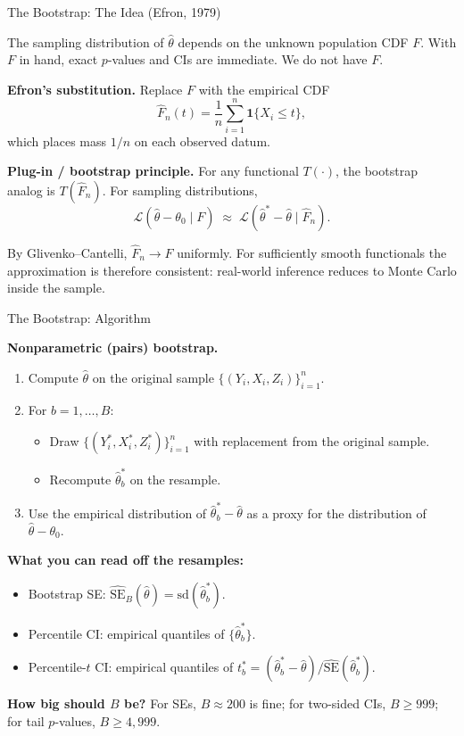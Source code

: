 \documentclass[aspectratio=169, handout]{beamer}
\numberwithin{equation}{section}
\begin{document}
\begin{frame}{The Bootstrap: The Idea (Efron, 1979)}

The sampling distribution of $\hat\theta$ depends on the unknown population CDF $F$. With $F$ in hand, exact $p$-values and CIs are immediate. We do not have $F$.

\medskip
\textbf{Efron's substitution.} Replace $F$ with the empirical CDF
$$\hat F_n(t) = \frac{1}{n}\sum_{i=1}^n \mathbf{1}\{X_i \le t\},$$
which places mass $1/n$ on each observed datum.

\medskip
\textbf{Plug-in / bootstrap principle.} For any functional $T(\cdot)$, the bootstrap analog is $T(\hat F_n)$. For sampling distributions,
$$\mathcal{L}\!\left(\hat\theta - \theta_0 \;\big|\; F\right) \;\approx\; \mathcal{L}\!\left(\hat\theta^{*} - \hat\theta \;\big|\; \hat F_n\right).$$

\medskip
By Glivenko--Cantelli, $\hat F_n \to F$ uniformly. For sufficiently smooth functionals the approximation is therefore consistent: real-world inference reduces to Monte Carlo inside the sample.

\end{frame}

\begin{frame}{The Bootstrap: Algorithm}

\textbf{Nonparametric (pairs) bootstrap.}
\begin{enumerate}
\setlength{\itemsep}{2pt}
\item Compute $\hat\theta$ on the original sample $\{(Y_i, X_i, Z_i)\}_{i=1}^n$.
\item For $b = 1, \dots, B$:
   \begin{itemize}
   \setlength{\itemsep}{1pt}
   \item Draw $\{(Y_i^*, X_i^*, Z_i^*)\}_{i=1}^n$ with replacement from the original sample.
   \item Recompute $\hat\theta_b^*$ on the resample.
   \end{itemize}
\item Use the empirical distribution of $\hat\theta_b^* - \hat\theta$ as a proxy for the distribution of $\hat\theta - \theta_0$.
\end{enumerate}

\medskip
\textbf{What you can read off the resamples:}
\begin{itemize}
\setlength{\itemsep}{1pt}
\item Bootstrap SE: $\widehat{\text{SE}}_B(\hat\theta) = \mathrm{sd}(\hat\theta_b^{*})$.
\item Percentile CI: empirical quantiles of $\{\hat\theta_b^{*}\}$.
\item Percentile-$t$ CI: empirical quantiles of $t_b^{*} = (\hat\theta_b^{*} - \hat\theta)/\widehat{\text{SE}}(\hat\theta_b^{*})$.
\end{itemize}

\medskip
\textbf{How big should $B$ be?} For SEs, $B \approx 200$ is fine; for two-sided CIs, $B \ge 999$; for tail $p$-values, $B \ge 4{,}999$.

\end{frame}
\end{document}
